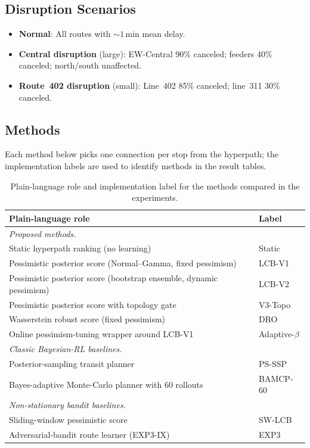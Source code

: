 \documentclass[11pt]{article}
\theoremstyle{definition}
\theoremstyle{remark}
\begin{document}
\subsection{Disruption Scenarios}

\begin{itemize}
    \item \textbf{Normal}: All routes with ${\sim}1$\,min mean delay.
    \item \textbf{Central disruption} (large): EW-Central 90\% canceled; feeders 40\% canceled; north/south unaffected.
    \item \textbf{Route~402 disruption} (small): Line~402 85\% canceled; line~311 30\% canceled.
\end{itemize}

\subsection{Methods}

Each method below picks one connection per stop from the
hyperpath; the implementation labels are used to identify methods
in the result tables.

\begin{table}[h]
\centering
\caption{Plain-language role and implementation label for the
methods compared in the experiments.}
\label{tab:methods_overview}
\scriptsize
\begin{tabular}{p{6.0cm} l}
\toprule
Plain-language role & Label \\
\midrule
\multicolumn{2}{l}{\emph{Proposed methods.}} \\
Static hyperpath ranking (no learning) & Static \\
Pessimistic posterior score (Normal--Gamma, fixed pessimism) & LCB-V1 \\
Pessimistic posterior score (bootstrap ensemble, dynamic pessimism) & LCB-V2 \\
Pessimistic posterior score with topology gate & V3-Topo \\
Wasserstein robust score (fixed pessimism) & DRO \\
Online pessimism-tuning wrapper around LCB-V1 & Adaptive-$\beta$ \\
\midrule
\multicolumn{2}{l}{\emph{Classic Bayesian-RL baselines.}} \\
Posterior-sampling transit planner~\cite{osband2017} & PS-SSP \\
Bayes-adaptive Monte-Carlo planner with 60 rollouts~\cite{guez2012} & BAMCP-60 \\
\midrule
\multicolumn{2}{l}{\emph{Non-stationary bandit baselines.}} \\
Sliding-window pessimistic score~\cite{garivier2011,luo2024} & SW-LCB \\
Adversarial-bandit route learner (EXP3-IX)~\cite{kocak2014,chen2024} & EXP3 \\
\bottomrule
\end{tabular}
\end{table}
\end{document}
